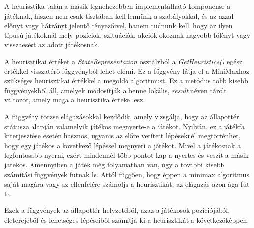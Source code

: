 \documentclass[
]{thesis-ekf}
\theoremstyle{definition}
\theoremstyle{remark}
\begin{document}
A heurisztika talán a másik legnehezebben implementálható komponense a játéknak, hiszen nem csak tisztában kell lennünk a szabályokkal, és az azzal előnyt vagy hátrányt jelentő tényezőivel, hanem tudnunk kell, hogy az ilyen típusú játékoknál mely pozíciók, szituációk, akciók okoznak nagyobb fölényt vagy visszaesést az adott játékosnak. 

A heurisztikai értéket a \emph{StateRepresentation} osztályból a \emph{GetHeuristics()} egész értékkel visszatérő függvényből lehet elérni. Ez a függvény látja el a MiniMaxhoz szükséges heurisztikai értékkel a megoldó algoritmust. Ez a metódus több kisebb függvényekből áll, amelyek módosítják a benne lokális, \emph{result} néven tárolt változót, amely maga a heurisztika értéke lesz. 

A függvény törzse elágazásokkal kezdődik, amely vizsgálja, hogy az állapottér státusza alapján valamelyik játékos megnyerte-e a játékot. Nyilván, ez a játékfa kiterjesztése esetén hasznos, ugyanis az előre vetített lépéseknél megtörténhet, hogy egy játékos a következő lépéssel megnyeri a játékot. Mivel a játékosnak a legfontosabb nyerni, ezért mindennél több pontot kap a nyertes és veszít a másik játékos. Amennyiben a játék még folyamatban van, úgy a további kisebb számítási függvények futnak le. Attól függően, hogy éppen a minimax algoritmus saját magára vagy az ellenfelére számolja a heurisztikát, az elágazás azon ága fut le.

Ezek a függvények az állapottér helyzetéből, azaz a játékosok pozíciójából, életerejéből és lehetséges lépéseiből számítja ki a heurisztikát a következőképpen: 
\end{document}
